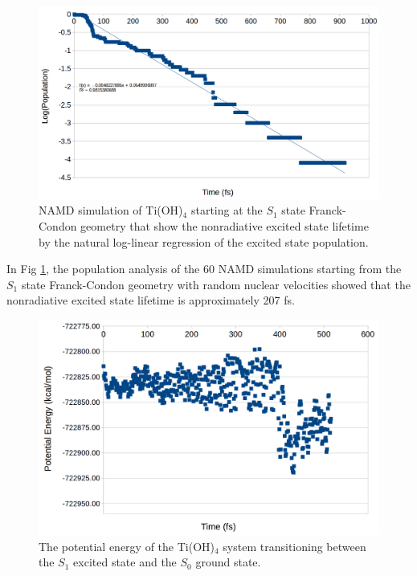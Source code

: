 \documentclass[11pt]{article}
\begin{document}
\begin{figure}[H]
  \centering
  \includegraphics[scale=0.23]{pop_analysis.png}
  \caption{NAMD simulation of Ti(OH)$_4$ starting at the $S_1$ state
    Franck-Condon geometry that show the nonradiative excited state lifetime
  by the natural log-linear regression of the excited state population.}
  \label{fig:pop}
\end{figure}

In Fig \ref{fig:pop}, the population analysis of the 60 NAMD simulations
starting from the $S_1$ state Franck-Condon geometry with random nuclear
velocities showed that the nonradiative excited state lifetime is
approximately 207 fs.

\begin{figure}[H]
  \centering
  \includegraphics[scale=0.23]{egy.png}
  \caption{The potential energy of the Ti(OH)$_4$ system transitioning
    between the $S_1$ excited state and the $S_0$ ground state.}
  \label{fig:energy}
\end{figure}
\end{document}
